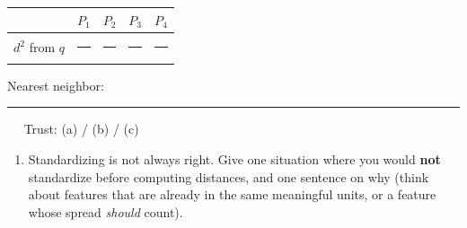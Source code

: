 \documentclass[
  11pt,
]{article}
\newcounter{none} %
\providecommand{\tightlist}{%
  \setlength{\itemsep}{0pt}\setlength{\parskip}{0pt}}
\newcommand{\answerspace}[1]{\par\vspace*{#1}}  %
\newcommand{\blank}[1][1.2in]{\rule{#1}{0.4pt}}
\begin{document}
{\def\LTcaptype{none} %
\begin{longtable}[]{@{}
  >{\centering\arraybackslash}p{}
  >{\centering\arraybackslash}p{}
  >{\centering\arraybackslash}p{}
  >{\centering\arraybackslash}p{}
  >{\centering\arraybackslash}p{}@{}}
\toprule\noalign{}
\begin{minipage}[b]{\linewidth}\centering
\end{minipage} & \begin{minipage}[b]{\linewidth}\centering
\(P_1\)
\end{minipage} & \begin{minipage}[b]{\linewidth}\centering
\(P_2\)
\end{minipage} & \begin{minipage}[b]{\linewidth}\centering
\(P_3\)
\end{minipage} & \begin{minipage}[b]{\linewidth}\centering
\(P_4\)
\end{minipage} \\
\midrule\noalign{}
\endhead
\bottomrule\noalign{}
\endlastfoot
\(d^2\) from \(q\) & \blank[0.9in] & \blank[0.9in] & \blank[0.9in] &
\blank[0.9in] \\
\end{longtable}
}

Nearest neighbor: \blank[0.7in] \(\quad\) Trust: (a) / (b) / (c)

\answerspace{2in}

\begin{enumerate}
\def\labelenumi{(\alph{enumi})}
\setcounter{enumi}{3}
\tightlist
\item
  Standardizing is not always right. Give one situation where you would
  \textbf{not} standardize before computing distances, and one sentence
  on why (think about features that are already in the same meaningful
  units, or a feature whose spread \emph{should} count).
\end{enumerate}

\answerspace{1.8in}
\end{document}
